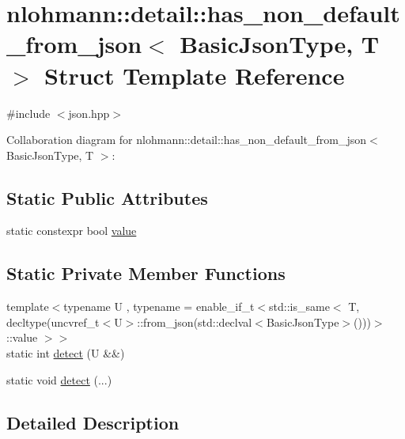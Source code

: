 \hypertarget{structnlohmann_1_1detail_1_1has__non__default__from__json}{}\section{nlohmann\+:\+:detail\+:\+:has\+\_\+non\+\_\+default\+\_\+from\+\_\+json$<$ Basic\+Json\+Type, T $>$ Struct Template Reference}
\label{structnlohmann_1_1detail_1_1has__non__default__from__json}


{\ttfamily \#include $<$json.\+hpp$>$}



Collaboration diagram for nlohmann\+:\+:detail\+:\+:has\+\_\+non\+\_\+default\+\_\+from\+\_\+json$<$ Basic\+Json\+Type, T $>$\+:
\subsection*{Static Public Attributes}
\begin{DoxyCompactItemize}
\item 
static constexpr bool \hyperlink{structnlohmann_1_1detail_1_1has__non__default__from__json_ad34bb7cd3961fcafc2c5047a9782e931}{value}
\end{DoxyCompactItemize}
\subsection*{Static Private Member Functions}
\begin{DoxyCompactItemize}
\item 
{\footnotesize template$<$typename U , typename  = enable\+\_\+if\+\_\+t$<$std\+::is\+\_\+same$<$                                   T, decltype(uncvref\+\_\+t$<$\+U$>$\+::from\+\_\+json(std\+::declval$<$\+Basic\+Json\+Type$>$()))$>$\+::value $>$$>$ }\\static int \hyperlink{structnlohmann_1_1detail_1_1has__non__default__from__json_a87428058d4e01d8f034ec5b2574795a3}{detect} (U \&\&)
\item 
static void \hyperlink{structnlohmann_1_1detail_1_1has__non__default__from__json_aa9d6fc482c9b96cf5ffbba95d4afd01a}{detect} (...)
\end{DoxyCompactItemize}


\subsection{Detailed Description}
